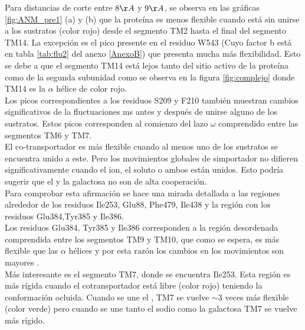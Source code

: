 Para distancias de corte entre $8\AA$ y $9\AA$, se observa en las gr\'{a}ficas \ref{fig:ANM_pre1} (a) y (b) que la prote\'{i}na  es menos flexible cuando est\'{a} sin unirse a los sustratos (color rojo) desde el segmento TM2 hasta el final del segmento TM14. La excepci\'{o}n es el pico presente en el residuo W543 (Cuyo factor b est\'{a} en tabla \ref{tab:flu2} del anexo \ref{AnexoB}) que presenta mucha m\'{a}s flexibilidad. Esto se debe a que el segmento TM14 est\'{a} lejos tanto del sitio activo de la prote\'{i}na como de la segunda subunidad como se observa en la figura \ref{fig:complejo} donde TM14 es la $\alpha$ h\'{e}lice de color rojo.\\

Los picos correspondientes a los residuos S209 y F210 tambi\'{e}n muestran cambios significativos de la fluctuaciones ms antes y despu\'{e}s de unirse alguno de los sustratos. Estos picos corresponden al comienzo del lazo $\omega$ comprendido entre las segmentos TM6 y TM7.\\

El co-transportador es m\'{a}s flexible cuando al menos uno de los sustratos se encuentra unido a este. Pero los movimientos globales de simportador no difieren significativamente cuando el ion, el soluto o ambos est\'{a}n unidos. Esto podr\'{i}a sugerir que el  y la galactosa no son de alta cooperaci\'{o}n.\\

Para comprobar esta afirmaci\'{o}n se hace una mirada detallada a las regiones alrededor de los residuos Ile253, Glu88, Phe479, Ile438 y la regi\'{o}n con los residuos Glu384,Tyr385 y Ile386.\\

Los residuos Glu384, Tyr385 y Ile386 corresponden a la regi\'{o}n desordenada comprendida entre los segmentos TM9 y TM10, que como se espera, es m\'{a}s flexible que las $\alpha$ h\'{e}lices y por esta raz\'{o}n los cambios en los movimientos son mayores .\\

M\'{a}s interesante es el segmento TM7, donde se encuentra Ile253. Esta regi\'{o}n es m\'{a}s r\'{i}gida cuando el cotransportador est\'{a} libre (color rojo) teniendo la conformaci\'{o}n ocluida. Cuando se une el , TM7 se vuelve $\sim 3$ veces m\'{a}s flexible (color verde) pero cuando se une tanto el sodio como la galactosa TM7 se vuelve m\'{a}s r\'{i}gido.\\

